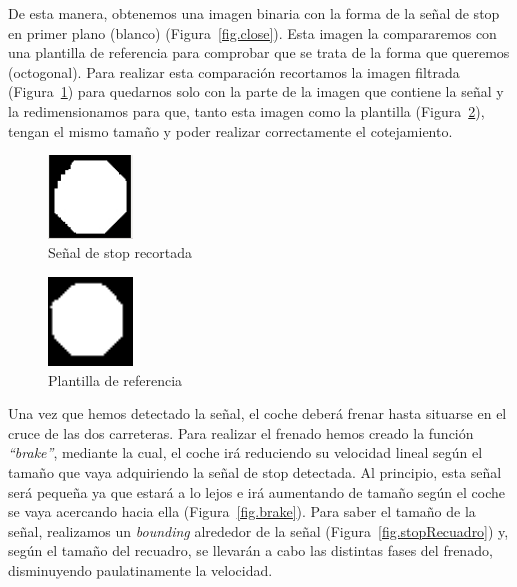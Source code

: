 De esta manera, obtenemos una imagen binaria con la forma de la señal de stop en primer plano (blanco) (Figura~\ref{fig.close}). Esta imagen la compararemos con una plantilla de referencia para comprobar que se trata de la forma que queremos (octogonal). Para realizar esta comparación recortamos la imagen filtrada (Figura~\ref{fig.cut}) para quedarnos solo con la parte de la imagen que contiene la señal y la redimensionamos para que, tanto esta imagen como la plantilla (Figura~\ref{fig.template}), tengan el mismo tamaño y poder realizar correctamente el cotejamiento. \\

\begin{figure}[H]
  \begin{center}
    \includegraphics[width=0.2\textwidth]{figures/Stop/cut.jpg}
		\caption{Señal de stop recortada}
		\label{fig.cut}
		\end{center}
\end{figure}

\begin{figure}[H]
  \begin{center}
    \includegraphics[width=0.2\textwidth]{figures/Stop/template.png}
		\caption{Plantilla de referencia}
		\label{fig.template}
		\end{center}
\end{figure}

Una vez que hemos detectado la señal, el coche deberá frenar hasta situarse en el cruce de las dos carreteras. Para realizar el frenado hemos creado la función \textit{``brake''}, mediante la cual, el coche irá reduciendo su velocidad lineal según el tamaño que vaya adquiriendo la señal de stop detectada. Al principio, esta señal será pequeña ya que estará a lo lejos e irá aumentando de tamaño según el coche se vaya acercando hacia ella (Figura~\ref{fig.brake}). Para saber el tamaño de la señal, realizamos un \textit{bounding} alrededor de la señal (Figura~\ref{fig.stopRecuadro}) y, según el tamaño del recuadro, se llevarán a cabo las distintas fases del frenado, disminuyendo paulatinamente la velocidad. \\

